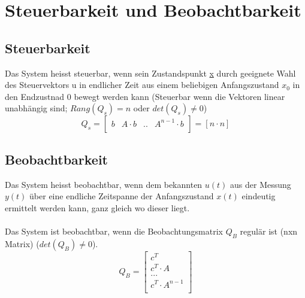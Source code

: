 



\section{Steuerbarkeit und Beobachtbarkeit}
\subsection{Steuerbarkeit}
Das System heisst steuerbar, wenn sein Zustandspunkt \underline{x} durch geeignete Wahl des Steuervektors u in endlicher Zeit aus einem beliebigen Anfangszustand $x_0$ in den Endzustnad 0 bewegt werden kann (Steuerbar wenn die Vektoren linear unabhängig sind; $Rang(Q_s) = n$ oder $det(Q_s)\neq 0$)
\[
	Q_s = 
	\begin{bmatrix}
			b	&	A\cdot b	& .. & A^{n-1} \cdot b\\
	\end{bmatrix}
	= \left[ n \cdot n\right] 
\]

\subsection{Beobachtbarkeit}
Das System heisst beobachtbar, wenn dem bekannten $u(t)$ aus der Messung $y(t)$ über eine endliche Zeitspanne der Anfangszustand $x(t)$ eindeutig ermittelt werden kann, ganz gleich wo dieser liegt.\\
\\
Das System ist beobachtbar, wenn die Beobachtungsmatrix $Q_B$ regulär ist (nxn Matrix) ($det(Q_B)\neq 0$).
\[
	Q_B=
	\begin{bmatrix}
		c^T\\
		c^T \cdot A\\
		...\\
		c^T\cdot A^{n-1}\\
	\end{bmatrix}
\]